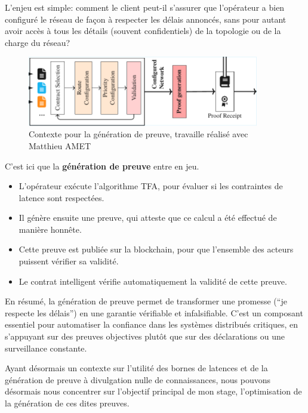 \documentclass[12pt]{report}
\begin{document}
\bigskip

L'enjeu est simple: comment le client peut-il s'assurer que l'opérateur a bien configuré le réseau de façon à respecter les délais annoncés, sans pour autant avoir accès à tous les détails (souvent confidentiels) de la topologie ou de la charge du réseau?

\bigskip

\begin{figure}[h!]
  \begin{center}
  \includegraphics[width=0.9\textwidth]{main_cropped.pdf}
  \caption{Contexte pour la génération de preuve, travaille réalisé avec Matthieu AMET}
  \end{center}
\end{figure}

\break


C'est ici que la \textbf{génération de preuve} entre en jeu.

\begin{itemize}
    \item L'opérateur exécute l'algorithme TFA, pour évaluer si les contraintes de latence sont respectées.
    \item Il génère ensuite une preuve, qui atteste que ce calcul a été effectué de manière honnête.
    \item Cette preuve est publiée sur la blockchain, pour que l'ensemble des acteurs puissent vérifier sa validité.
    \item Le contrat intelligent vérifie automatiquement la validité de cette preuve.
\end{itemize}

\medskip

En résumé, la génération de preuve permet de transformer une promesse (``je respecte les délais'') en une garantie vérifiable et infalsifiable. C'est un composant essentiel pour automatiser la confiance dans les systèmes distribués critiques, en s'appuyant sur des preuves objectives plutôt que sur des déclarations ou une surveillance constante.

\medskip

Ayant désormais un contexte sur l'utilité des bornes de latences
et de la génération de preuve à divulgation nulle de connaissances,
nous pouvons désormais nous concentrer sur l'objectif principal de
mon stage, l'optimisation de la génération de ces dites preuves.
\end{document}
